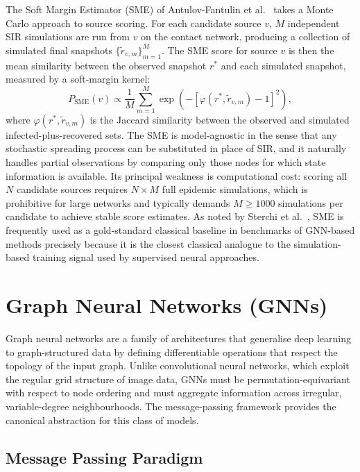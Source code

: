 The Soft Margin Estimator (SME) of Antulov-Fantulin et al.~\cite{AntulovFantulin2015} takes a Monte Carlo approach to source scoring. For each candidate source $v$, $M$ independent SIR simulations are run from $v$ on the contact network, producing a collection of simulated final snapshots $\{\tilde{r}_{v,m}\}_{m=1}^M$. The SME score for source $v$ is then the mean similarity between the observed snapshot $r^*$ and each simulated snapshot, measured by a soft-margin kernel:
\[
    P_{\mathrm{SME}}(v) \propto \frac{1}{M} \sum_{m=1}^{M} \exp\!\left(-\left[\varphi(r^*, \tilde{r}_{v,m}) - 1\right]^2\right),
\]
where $\varphi(r^*, \tilde{r}_{v,m})$ is the Jaccard similarity between the observed and simulated infected-plus-recovered sets. The SME is model-agnostic in the sense that any stochastic spreading process can be substituted in place of SIR, and it naturally handles partial observations by comparing only those nodes for which state information is available. Its principal weakness is computational cost: scoring all $N$ candidate sources requires $N \times M$ full epidemic simulations, which is prohibitive for large networks and typically demands $M \geq 1000$ simulations per candidate to achieve stable score estimates. As noted by Sterchi et al.~\cite{Sterchi2025}, SME is frequently used as a gold-standard classical baseline in benchmarks of GNN-based methods precisely because it is the closest classical analogue to the simulation-based training signal used by supervised neural approaches.

\section{Graph Neural Networks (GNNs)}
\label{st:section4}

Graph neural networks are a family of architectures that generalise deep learning to graph-structured data by defining differentiable operations that respect the topology of the input graph. Unlike convolutional neural networks, which exploit the regular grid structure of image data, GNNs must be permutation-equivariant with respect to node ordering and must aggregate information across irregular, variable-degree neighbourhoods. The message-passing framework provides the canonical abstraction for this class of models.

\subsection{Message Passing Paradigm}

